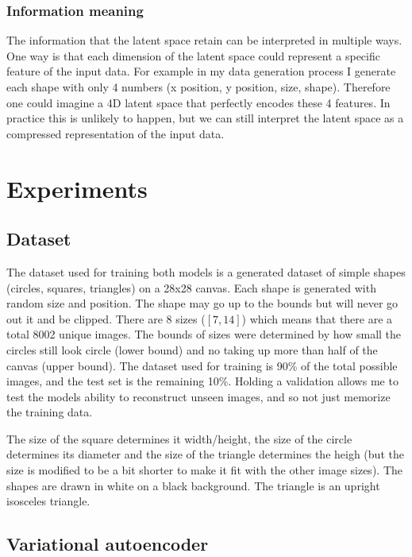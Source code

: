 \documentclass[conference,a4paper]{IEEEtran}
\begin{document}
\subsubsection{Information meaning}

The information that the latent space retain can be interpreted in multiple ways. One way is that each dimension of the latent space could represent a specific feature of the input data. For example in my data generation process I generate each shape with only 4 numbers (x position, y position, size, shape). Therefore one could imagine a 4D latent space that perfectly encodes these 4 features. In practice this is unlikely to happen, but we can still interpret the latent space as a compressed representation of the input data.

\section{Experiments}

\subsection{Dataset}

The dataset used for training both models is a generated dataset of simple shapes (circles, squares, triangles) on a 28x28 canvas. Each shape is generated with random size and position. The shape may go up to the bounds but will never go out it and be clipped. There are 8 sizes ($[7,14]$) which means that there are a total 8002 unique images. The bounds of sizes were determined by how small the circles still look circle (lower bound) and no taking up more than half of the canvas (upper bound). The dataset used for training is 90\% of the total possible images, and the test set is the remaining 10\%. Holding a validation allows me to test the models ability to reconstruct unseen images, and so not just memorize the training data.

The size of the square determines it width/height, the size of the circle determines its diameter and the size of the triangle determines the heigh (but the size is modified to be a bit shorter to make it fit with the other image sizes). The shapes are drawn in white on a black background. The triangle is an upright isosceles triangle.

\subsection{Variational autoencoder}
\end{document}
